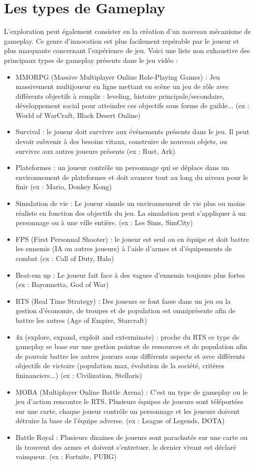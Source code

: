 \section{Les types de Gameplay}
L'exploration peut également consister en la création d'un nouveau mécanisme de gameplay. Ce genre d'innovation est plus facilement repérable par le joueur et plus marquante concernant l'expérience de jeu. Voici une liste non exhaustive des principaux types de gameplay présents dans le jeu vidéo :
\begin{itemize}
    \item MMORPG (Massive Multiplayer Online Role-Playing Games) : Jeu massivement multijoueur en ligne mettant en scène un jeu de rôle avec différents objectifs à remplir : leveling, histoire principale/secondaire, développement social pour atteindre ces objectifs sous forme de guilde... (ex : World of WarCraft, Black Desert Online)
    \item Survival : le joueur doit survivre aux événements présents dans le jeu. Il peut devoir subvenir à des besoins vitaux, construire de nouveau objets, ou survivre aux autres joueurs présents (ex : Rust, Ark)
    \item Plateformes : un joueur contrôle un personnage qui se déplace dans un environnement de plateformes et doit avancer tout au long du niveau pour le finir (ex : Mario, Donkey Kong)
    \item Simulation de vie : Le joueur simule un environnement de vie plus ou moins réaliste en fonction des objectifs du jeu. La simulation peut s'appliquer à un personnage ou à une ville entière. (ex : Les Sims, SimCity)
    \item FPS (First Personnal Shooter) : le joueur est seul ou en équipe et doit battre les ennemis (IA ou autres joueurs) à l'aide d'armes et d'équipements de combat (ex : Call of Duty, Halo)
    \item Beat-em up : Le joueur fait face à des vagues d'ennemis toujours plus fortes (ex : Bayonnetta, God of War)
    \item RTS (Real Time Strategy) : Des joueurs se font fasse dans un jeu ou la gestion d'économie, de troupes et de population est omniprésente afin de battre les autres (Age of Empire, Starcraft)
    \item 4x (explore, expand, exploit and exterminate) : proche du RTS ce type de gameplay se base sur une gestion pointue de ressources et de population afin de pouvoir battre les autres joueurs sous différents aspects et avec différents objectifs de victoire (population max, évolution de la société, critères fininanciers...) (ex : Civilization, Stellaris)
    \item MOBA (Multiplayer Online Battle Arena) : C'est un type de gameplay ou le jeu d'action rencontre le RTS. Plusieurs équipes de joueurs sont téléportées sur une carte, chaque joueur contrôle un personnage et les joueurs doivent détruire la base de l'équipe adverse. (ex : League of Legends, DOTA)
    \item Battle Royal : Plusieurs dizaines de joueurs sont parachutés sur une carte ou ils trouvent des armes et doivent s'entretuer. le dernier vivant est déclaré vainqueur. (ex : Fortnite, PUBG)
\end{itemize}

